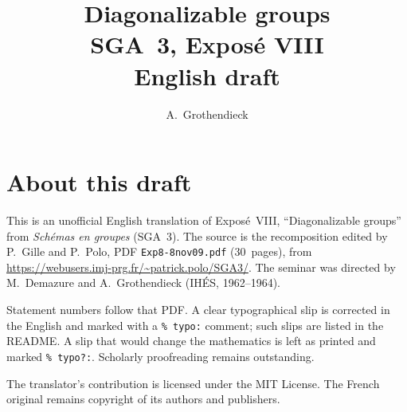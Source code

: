 \documentclass[11pt,a4paper,oneside]{amsbook}
\title[SGA~3, Expos\'e VIII (English draft)]{Diagonalizable groups\\
{\normalsize SGA~3, Expos\'e VIII\\English draft}}
\author{A.\ Grothendieck}
\date{}
\begin{document}
\frontmatter
\maketitle

\chapter*{About this draft}
This is an unofficial English translation of Expos\'e~VIII, ``Diagonalizable groups''
from \textit{Sch\'emas en groupes} (SGA~3).
The source is the recomposition edited by P.~Gille and P.~Polo,
PDF \texttt{Exp8-8nov09.pdf} (30~pages),
from \url{https://webusers.imj-prg.fr/~patrick.polo/SGA3/}.
The seminar was directed by M.~Demazure and A.~Grothendieck
(IH\'ES, 1962--1964).

Statement numbers follow that PDF. A clear typographical slip is
corrected in the English and marked with a \texttt{\% typo:} comment;
such slips are listed in the README. A slip that would change the
mathematics is left as printed and marked \texttt{\% typo?:}.
Scholarly proofreading remains outstanding.

The translator's contribution is licensed under the MIT License.
The French original remains copyright of its authors and publishers.

\tableofcontents
\mainmatter





\end{document}
